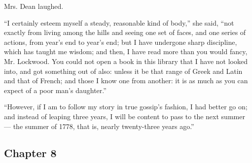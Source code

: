 \par Mrs. Dean laughed.
\par “I certainly esteem myself a steady, reasonable kind of body,” she said, “not exactly from living among the hills and seeing one set of faces, and one series of actions, from year's end to year's end; but I have undergone sharp discipline, which has taught me wisdom; and then, I have read more than you would fancy, Mr. Lockwood. You could not open a book in this library that I have not looked into, and got something out of also: unless it be that range of Greek and Latin and that of French; and those I know one from another: it is as much as you can expect of a poor man's daughter.”
\par “However, if I am to follow my story in true gossip's fashion, I had better go on; and instead of leaping three years, I will be content to pass to the next summer — the summer of 1778, that is, nearly twenty-three years ago.”









\subsection*{Chapter 8}


